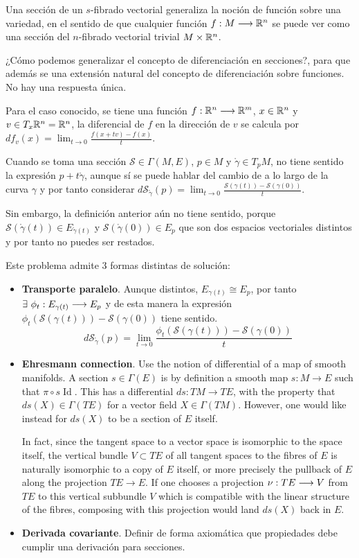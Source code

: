 Una sección de un $s$-fibrado vectorial generaliza la noción de función sobre una variedad, en el sentido de
que cualquier
función $f:M\longrightarrow \mathbb{R}^n$ se puede ver como una sección del $n$-fibrado vectorial trivial $M\times\mathbb{R}^n$.

¿Cómo podemos generalizar el concepto de diferenciación en secciones?, para que además se una extensión natural del
concepto de diferenciación sobre funciones.
No hay una respuesta única.

Para el caso conocido, se tiene una función $f:\mathbb{R}^n\longrightarrow \mathbb{R}^m$, $x\in\mathbb{R}^n$ y $v\in T_x \mathbb{R}^n=\mathbb{R}^n$, la diferencial
de $f$ en la dirección de $v$ se calcula por $df_v(x)=\lim_{t\to 0}{\frac {f(x+tv)-f(x)}{t}}$.

Cuando se toma una sección $\mathcal{S}\in\Gamma(M, E)$, $p\in M$ y $\mathring{\gamma}\in T_p M$, no tiene sentido la
expresión $p+t\mathring{\gamma}$, aunque sí se puede hablar del cambio de  a lo largo de la curva $\gamma$
y por tanto considerar $d\mathcal{S}_{\mathring{\gamma}}(p)=\lim_{t\to 0}\frac{\mathcal{S}(\gamma (t))-\mathcal{S}
(\gamma (0))}{t}$.

Sin embargo, la definición anterior aún no tiene sentido, porque $\mathcal{S}(\mathring{\gamma}(t))\in
E_{\mathring{\gamma}(t)}$ y $\mathcal{S}(\mathring{\gamma}(0))\in E_p$ que son dos espacios vectoriales distintos y
por tanto no puedes ser restados.

Este problema admite 3 formas distintas de solución:
\begin{itemize}
  \item \textbf{Transporte paralelo}.
  Aunque distintos, $E_{\gamma(t)}\cong E_p$, por tanto $\exists\ \phi_t:E_{\gamma(t)
  }\longrightarrow E_p$ y de esta manera la expresión $\phi_t(\mathcal{S}(\gamma (t)))-\mathcal{S}(\gamma (0))$ tiene sentido.
  \[
    d\mathcal{S}_{\mathring{\gamma}}(p)=\lim_{t\to 0}\frac{\phi_t(\mathcal{S}(\gamma (t)))-\mathcal{S}
    (\gamma (0))}{t}
  \]

  \item \textbf{Ehresmann connection}.
  Use the notion of differential of a map of smooth manifolds.
  A section $s\in \Gamma (E)$ is by definition a smooth map $s:M\to E$ such
  that $\pi \circ s\operatorname{Id}$.
  This has a differential $ds:TM\to TE$, with the property that $ds(X)\in \Gamma (TE)$
 for a vector field $X\in \Gamma (TM)$.
  However, one would like instead for $ds(X)$ to be a section of $E$ itself.

  In fact, since the tangent space to a vector space is isomorphic to the space itself, the vertical bundle
  $V\subset TE$ of all tangent spaces to the fibres of $E$ is naturally isomorphic to a copy of $E$
  itself, or more precisely the pullback of $E$ along the projection $TE\to E$.
  If one chooses a projection $\nu:TE\longrightarrow V$ from $TE$ to this vertical subbundle
  $V$ which is compatible with the linear structure of the fibres, composing with this projection would land
  $ds(X)$ back in $E$.


  \item \textbf{Derivada covariante}.
  Definir de forma axiomática que propiedades debe cumplir una derivación para secciones.
\end{itemize}

